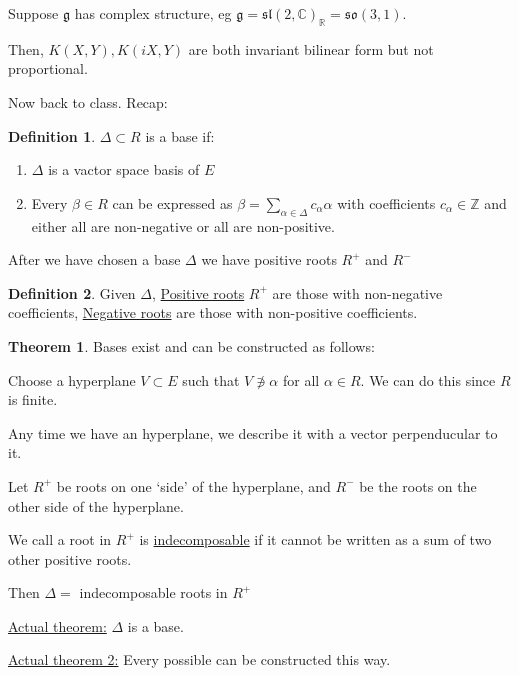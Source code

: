 \documentclass{article}
\theoremstyle{definition}
\newtheorem{definition}{Definition}
\newtheorem{theorem}{Theorem}
\begin{document}
Suppose \(\mathfrak{g}\) has complex structure, eg \(\mathfrak{g} = \mathfrak{sl} (2,\mathbb{C})_\mathbb{R}=\mathfrak{so}(3,1)\).

Then, \(K(X,Y),K(iX,Y)\) are both invariant bilinear form but not proportional.

Now back to class. Recap:

\begin{definition}
    \(\Delta \subset R\) is a base if:

    \begin{enumerate}
        \item \(\Delta \) is a vactor space basis of \(E\) 
        \item Every \(\beta \in R\) can be expressed as \(\beta = \sum_{\alpha \in \Delta } c_\alpha \alpha \) with coefficients \(c_\alpha \in \mathbb{Z}\) and either all are non-negative or all are non-positive.
    \end{enumerate}
\end{definition}

After we have chosen a base \(\Delta\) we have positive roots \(R^+\) and \(R^-\)

\begin{definition}
    Given \(\Delta\), \underline{Positive roots} \(R^+\) are those with non-negative coefficients, \underline{Negative roots} are those with non-positive coefficients. 
\end{definition}

\begin{theorem}
    Bases exist and can be constructed as follows:

    Choose a hyperplane \(V \subset E\) such that \(V\not\ni\alpha\) for all \(\alpha \in R\). We can do this since \(R\) is finite.

    Any time we have an hyperplane, we describe it with a vector perpenducular to it.

    Let \(R^+\) be roots on one `side' of the hyperplane, and \(R^-\) be the roots on the other side of the hyperplane.

    We call a root in \(R^+\) is \underline{indecomposable} if it cannot be written as a sum of two other positive roots.

    Then \(\Delta =\) indecomposable roots in \(R^+\)

    \underline{Actual theorem:} \(\Delta\) is a base.

    \underline{Actual theorem 2:} Every possible can be constructed this way.

\end{theorem}
\end{document}
